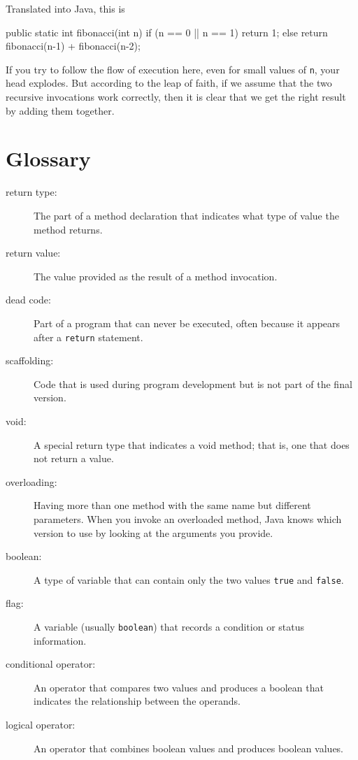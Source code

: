 Translated into Java, this is

\begin{code}
  public static int fibonacci(int n) {
    if (n == 0 || n == 1) {
      return 1;
    } else {
      return fibonacci(n-1) + fibonacci(n-2);
    }
  }
\end{code}

If you try to follow the flow of execution here, even for small
values of {\tt n}, your head explodes.  But according to the leap of
faith, if we assume that the two recursive invocations work correctly, then
it is clear that we get the right result by adding them together.


\section{Glossary}

\begin{description}

\item[return type:]  The part of a method declaration that indicates
what type of value the method returns.

\item[return value:]  The value provided as the result of a method
invocation.

\item[dead code:]  Part of a program that can never be executed,
often because it appears after a {\tt return} statement.

\item[scaffolding:]  Code that is used during program development
but is not part of the final version.

\item[void:]  A special return type that indicates a void method;
that is, one that does not return a value.

\item[overloading:]  Having more than one method with the same name
but different parameters.  When you invoke an overloaded method,
Java knows which version to use by looking at the arguments you
provide.

\item[boolean:]  A type of variable that can contain only the two
values {\tt true} and {\tt false}.

\item[flag:]  A variable (usually {\tt boolean}) that records
a condition or status information.

\item[conditional operator:]  An operator that compares two values
and produces a boolean that indicates the relationship between the
operands.

\item[logical operator:]  An operator that combines boolean values
and produces boolean values.



\end{description}


